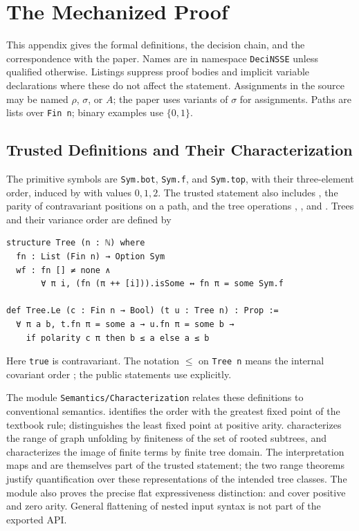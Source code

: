 \section{The Mechanized Proof}
\label{app:lean}

This appendix gives the formal definitions, the decision chain, and the
correspondence with the paper. Names are in namespace \texttt{DeciNSSE}
unless qualified otherwise. Listings suppress proof bodies and implicit
variable declarations where these do not affect the statement. Assignments
in the source may be named $\rho$, $\sigma$, or $A$; the paper uses variants
of $\sigma$ for assignments. Paths are lists over
\texttt{Fin n}; binary examples use $\{0,1\}$.

\subsection{Trusted Definitions and Their Characterization}
\label{app:lean-statement}
The primitive symbols are \texttt{Sym.bot}, \texttt{Sym.f}, and
\texttt{Sym.top}, with their three-element order, induced by  with values
$0,1,2$. The trusted statement also includes , the parity
of contravariant positions on a path, and the tree operations
, , and .
Trees and their variance order are defined by
\begin{lstlisting}
structure Tree (n : ℕ) where
  fn : List (Fin n) → Option Sym
  wf : fn [] ≠ none ∧
       ∀ π i, (fn (π ++ [i])).isSome ↔ fn π = some Sym.f

def Tree.Le (c : Fin n → Bool) (t u : Tree n) : Prop :=
  ∀ π a b, t.fn π = some a → u.fn π = some b →
    if polarity c π then b ≤ a else a ≤ b
\end{lstlisting}
Here \texttt{true} is contravariant. The notation $\le$ on \texttt{Tree n}
means the internal covariant order ; the public statements
use  explicitly.

The module \texttt{Semantics/Characterization} relates these definitions
to conventional semantics.  identifies
the order with the greatest fixed point of the textbook rule;
 distinguishes the least fixed point
at positive arity.  characterizes
the range of graph unfolding by finiteness of the set of rooted subtrees,
and  characterizes the image of
finite terms by finite tree domain. The interpretation maps  and 
are themselves part of the trusted statement; the two range theorems
justify quantification over these representations of the intended tree classes. The module also proves the precise
flat expressiveness distinction:
 and
 cover positive and zero arity.
General flattening of nested input syntax is not part of the exported API.

